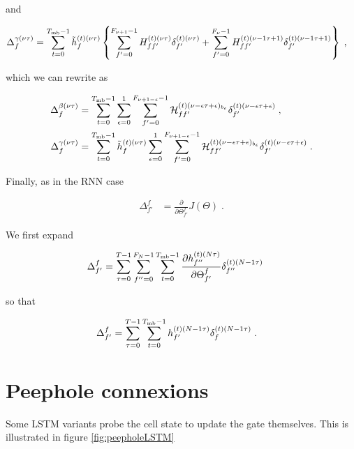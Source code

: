 \begin{subappendices}
and

\begin{align}
\Delta^{\gamma(\nu\tau)}_{f}&=\sum_{t=0}^{T_{{\rm mb}}-1}\tilde{h}^{(t)(\nu\tau)}_{f}\left\{\sum_{f'=0}^{F_{\nu+1}-1}
%
H^{(t)(\nu\tau)}_{ff'}\delta^{(t)(\nu\tau)}_{f'}
%
+\sum_{f'=0}^{F_{\nu}-1}H^{(t)(\nu-1\tau+1)}_{ff'}\delta^{(t)(\nu-1\tau+1)}_{f'}\right\}\;,
\end{align}

which we can rewrite as

\begin{align}
\Delta^{\beta(\nu \tau)}_{f}&=\sum_{t=0}^{T_{{\rm mb}}-1}\sum_{\epsilon=0}^{1}\sum_{f'=0}^{F_{\nu+1-\epsilon}-1}
%
\mathcal{H}^{(t)(\nu-\epsilon\tau+\epsilon)_{b_\epsilon}}_{ff'}\delta^{(t)(\nu-\epsilon\tau+\epsilon)}_{f'}\;,\\
%
\Delta^{\gamma(\nu \tau)}_{f}&=\sum_{t=0}^{T_{{\rm mb}}-1}\tilde{h}^{(t)(\nu\tau)}_{f}\sum_{\epsilon=0}^{1}\sum_{f'=0}^{F_{\nu+1-\epsilon}-1}
%
\mathcal{H}^{(t)(\nu-\epsilon\tau+\epsilon)_{b_\epsilon}}_{ff'}\delta^{(t)(\nu-\epsilon\tau+\epsilon)}_{f'}\;.
\end{align}

Finally, as in the RNN case

\begin{align}
\Delta^{f}_{f'}&=\frac{\partial}{\partial \Theta^{f}_{f'}} J(\Theta)\;.
\end{align}

We first expand

\begin{align}
\Delta^{f}_{f'}&=\sum_{\tau=0}^{T-1}\sum_{f''=0}^{F_N-1}\sum_{t=0}^{T_{{\rm mb}}-1}
%
\frac{\partial h^{(t)(N\tau)}_{f''}}{\partial \Theta^{f}_{f'}}
%
\delta^{(t)(N-1\tau)}_{f''}\;
\end{align}

so that

\begin{align}
\Delta^{f}_{f'}&=\sum_{\tau=0}^{T-1}\sum_{t=0}^{T_{{\rm mb}}-1} h^{(t)(N-1\tau)}_{f'}\delta^{(t)(N-1\tau)}_{f}\;.
\end{align}

\newpage

\section{Peephole connexions}

Some LSTM variants probe the cell state to update the gate themselves. This is illustrated in figure \ref{fig:peepholeLSTM}


\end{subappendices}
